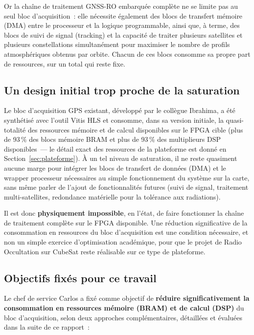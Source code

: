 \documentclass[11pt,a4paper]{article}
\begin{document}
Or la chaîne de traitement GNSS-RO embarquée complète ne se limite pas au seul bloc d'acquisition~: elle nécessite également des blocs de transfert mémoire (DMA) entre le processeur et la logique programmable, ainsi que, à terme, des blocs de suivi de signal (tracking) et la capacité de traiter plusieurs satellites et plusieurs constellations simultanément pour maximiser le nombre de profils atmosphériques obtenus par orbite. Chacun de ces blocs consomme sa propre part de ressources, sur un total qui reste fixe.

\subsection{Un design initial trop proche de la saturation}

Le bloc d'acquisition GPS existant, développé par le collègue Ibrahima, a été synthétisé avec l'outil Vitis HLS et consomme, dans sa version initiale, la quasi-totalité des ressources mémoire et de calcul disponibles sur le FPGA cible (plus de 93\,\% des blocs mémoire BRAM et plus de 93\,\% des multiplieurs DSP disponibles~--- le détail exact des ressources de la plateforme est donné en Section~\ref{sec:plateforme}). À un tel niveau de saturation, il ne reste quasiment aucune marge pour intégrer les blocs de transfert de données (DMA) et le wrapper processeur nécessaires au simple fonctionnement du système sur la carte, sans même parler de l'ajout de fonctionnalités futures (suivi de signal, traitement multi-satellites, redondance matérielle pour la tolérance aux radiations).

Il est donc \textbf{physiquement impossible}, en l'état, de faire fonctionner la chaîne de traitement complète sur le FPGA disponible. Une réduction significative de la consommation en ressources du bloc d'acquisition est une condition nécessaire, et non un simple exercice d'optimisation académique, pour que le projet de Radio Occultation sur CubeSat reste réalisable sur ce type de plateforme.

\subsection{Objectifs fixés pour ce travail}

Le chef de service Carlos a fixé comme objectif de \textbf{réduire significativement la consommation en ressources mémoire (BRAM) et de calcul (DSP)} du bloc d'acquisition, selon deux approches complémentaires, détaillées et évaluées dans la suite de ce rapport~:
\end{document}
